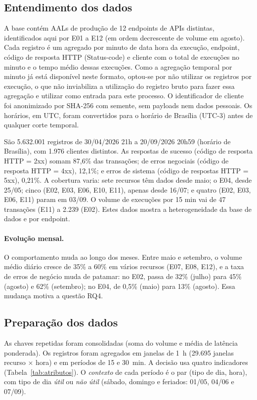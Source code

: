 \documentclass[sigconf,nonacm]{acmart}
\begin{document}
\subsection{Entendimento dos dados}
A base contém AALs de produção de 12 endpoints de APIs distintas, identificados aqui por E01 a E12 (em ordem decrescente de volume em agosto). Cada registro é um agregado por minuto de data hora da execução, endpoint, código de resposta HTTP (Status-code) e cliente com o total de execuções no minuto e o tempo médio dessas execuções. Como a agregação temporal por minuto já está disponível neste formato, optou-se por não utilizar os registros por execução, o que não inviabiliza a utilização do registro bruto para fazer essa agregação e utilizar como entrada para este processo. O identificador de cliente foi anonimizado por SHA-256 com semente, sem payloads nem dados pessoais. Os horários, em UTC, foram convertidos para o horário de Brasília (UTC-3) antes de qualquer corte temporal.

São 5.632.001 registros de 30/04/2026 21h a 20/09/2026 20h59 (horário de Brasília), com 1.976 clientes distintos. As respostas de sucesso (código de resposta HTTP = 2xx) somam 87,6\% das transações; de erros negociais (código de resposta HTTP = 4xx), 12,1\%; e erros de sistema (código de respostas HTTP = 5xx), 0,21\%. A cobertura varia: sete recursos têm dados desde maio; o E04, desde 25/05; cinco (E02, E03, E06, E10, E11), apenas desde 16/07; e quatro (E02, E03, E06, E11) param em 03/09. O volume de execuções por 15 min vai de 47 transações (E11) a 2.239 (E02). Estes dados mostra a heterogeneidade da base de dados e por endpoint. 

\paragraph{Evolução mensal.} O comportamento muda ao longo dos meses. Entre maio e setembro, o volume médio diário cresce de 35\% a 60\% em vários recursos (E07, E08, E12), e a taxa de erros de negócio muda de patamar: no E02, passa de 32\% (julho) para 45\% (agosto) e 62\% (setembro); no E04, de 0,5\% (maio) para 13\% (agosto). Essa mudança motiva a questão RQ4.

\subsection{Preparação dos dados}
As chaves repetidas foram consolidadas (soma do volume e média de latência ponderada). Os registros foram agregados em janelas de 1~h (29.695 janelas recurso $\times$ hora) e em períodos de 15 e 30~min. A decisão usa quatro indicadores (Tabela~\ref{tab:atributos}). O \emph{contexto} de cada período é o par (tipo de dia, hora), com tipo de dia \emph{útil} ou \emph{não útil} (sábado, domingo e feriados: 01/05, 04/06 e 07/09).
\end{document}
